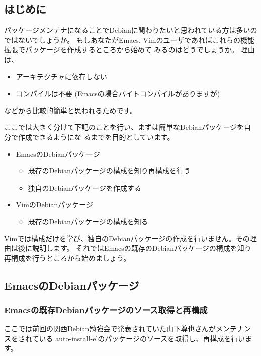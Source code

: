 \documentclass[mingoth,a4paper]{jsarticle}
\begin{document}
\subsection{はじめに}

パッケージメンテナになることでDebianに関わりたいと思われている方は多いのではないでしょうか。
もしあなたがEmacs, Vimのユーザであればこれらの機能拡張でパッケージを作成するところから始めて
みるのはどうでしょうか。
理由は、
\begin{itemize}
 \item アーキテクチャに依存しない
 \item コンパイルは不要 (Emacsの場合バイトコンパイルがありますが)
\end{itemize}
などから比較的簡単と思われるためです。

ここでは大きく分けて下記のことを行い、まずは簡単なDebianパッケージを自分で作成できるようにな
るまでを目的としています。

\begin{itemize}
  \item EmacsのDebianパッケージ
    \begin{itemize}
      \item 既存のDebianパッケージの構成を知り再構成を行う
      \item 独自のDebianパッケージを作成する
    \end{itemize}
  \item VimのDebianパッケージ
    \begin{itemize}
      \item 既存のDebianパッケージの構成を知る
    \end{itemize}
\end{itemize}

Vimでは構成だけを学び、独自のDebianパッケージの作成を行いません。その理由は後に説明します。
それではEmacsの既存のDebianパッケージの構成を知り再構成を行うところから始めましょう。

\subsection{EmacsのDebianパッケージ}

\subsubsection{Emacsの既存Debianパッケージのソース取得と再構成}

ここでは前回の関西Debian勉強会で発表されていた山下尊也さんがメンテナンスをされている
auto-install-elのパッケージのソースを取得し、再構成を行います。
\end{document}
